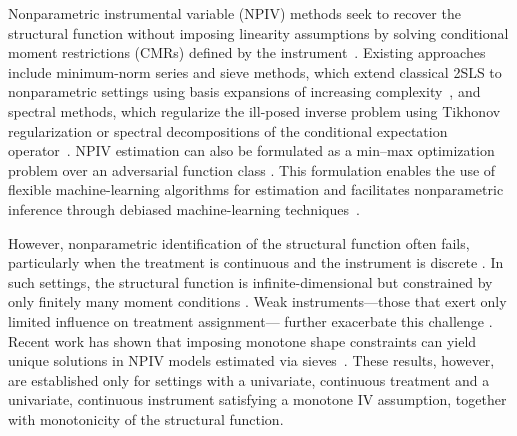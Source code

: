 \documentclass[11pt]{article}
\theoremstyle{plain}
\theoremstyle{definition}
\theoremstyle{remark}
\theoremstyle{definition}
\begin{document}
 
Nonparametric instrumental variable (NPIV) methods seek to recover the structural
function without imposing linearity assumptions by solving conditional moment
restrictions (CMRs) defined by the instrument~\citep{ai2003efficient,
newey2003instrumental, hall2005nonparametric, darolles2011nonparametric,
horowitz2011applied, ai2012semiparametric, newey2013nonparametric}. Existing approaches include minimum-norm series and sieve methods, which extend
classical 2SLS to nonparametric settings using basis
expansions of increasing complexity~\citep{newey2003instrumental, chen2007sieve,
chen2013optimal, chen2016methods, chetverikov2017nonparametric}, and spectral methods, which
regularize the ill-posed inverse problem using Tikhonov regularization or
spectral decompositions of the conditional expectation
operator~\citep{hall2005nonparametric, blundell2007semi, carrasco2007linear,
chen2011rate, darolles2011nonparametric, engl2015regularization,
meunier2025demystifying}. NPIV estimation can also be formulated as a min--max
optimization problem over an adversarial function class
\citep{lewis2018adversarial, dikkala2020minimax, daskalakis2021complexity,
bennett2023minimax}. This formulation enables the use of flexible
machine-learning algorithms for estimation and facilitates nonparametric
inference through debiased machine-learning techniques~\citep{bennett2023inference,
bennett2023source}.

 

 
However, nonparametric identification of the structural function often fails,  
particularly when the treatment is continuous and the instrument is discrete  
\citep{carrasco2007linear, darolles2011nonparametric, newey2013nonparametric, chen2014local, song2024instrumental}.  
In such settings, the structural function is infinite-dimensional but constrained  
by only finitely many moment conditions \citep{florens2012instrumental, newey2013nonparametric}. Weak instruments---those that exert only limited influence on treatment assignment--- 
further exacerbate this challenge \citep{hahn2003weak}.  
Recent work has shown that imposing monotone shape constraints can yield unique
solutions in NPIV models estimated via sieves~\citep{scaillet2016ill,
chetverikov2017nonparametric}. These results, however, are established only for
settings with a univariate, continuous treatment and a univariate, continuous
instrument satisfying a monotone IV assumption, together with monotonicity of
the structural function.



 
\end{document}
